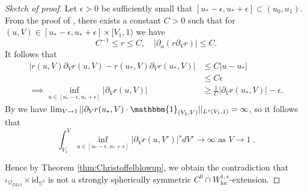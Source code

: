 \documentclass{article}
\newcommand{\Q}{\mathcal{Q}}
\newcommand{\loc}{\mathrm{loc}}
\newcommand{\Sp}{\mathbb{S}}
\newcommand{\id}{\mathrm{id}}
\begin{document}
\begin{proof}[Sketch of proof]
 Let $\epsilon>0$ be sufficiently small that $[u_*-\epsilon,u_*+\epsilon]\subset(u_0,u_1)$. From the proof of \cite[Proposition C.1]{LukOh19I}, there exists a constant $C>0$ such that for $(u,V)\in [u_*-\epsilon,u_*+\epsilon]\times [V_1,1)$ we have
    \begin{equation}
        C^{-1}\leq r\leq C,\quad \left|\partial_u(r\partial_Vr)\right|\leq C.
    \end{equation}
It follows that 
\begin{equation}
    \begin{split}
        \left|r(u,V)\partial_Vr(u,V)-r(u_*,V)\partial_Vr(u_*,V)\right|&\leq C|u-u_*|\\
        &\leq C\epsilon\\
        \implies\inf_{u\in[u_*-\epsilon,u_*+\epsilon]}\left|\partial_Vr(u,V)\right|&\geq \frac{1}{C}\left|\partial_Vr(u_*,V)\right|-\epsilon.
    \end{split}
\end{equation}
By \cite[Proposition C.1]{LukOh19I} we have $\lim_{V\to1}||\partial_Vr(u_*,V)\cdot\mathbbm{1}_{(V_1,V)}||_{L^s(V_1,1)}=\infty$, so it follows that 
\begin{equation}
    \int_{V_1}^V \inf_{u\in[u_*-\epsilon,u_*+\epsilon]}  \left|\partial_Vr(u,V')\right|^{s} dV'\to\infty\text{ as }V\to1\;.
\end{equation}
    
    Hence by Theorem \ref{thm:Christoffelblowup}, we obtain the contradiction that $\iota_{\Q_{DLO}} \times \id_{\Sp^2}$ is not a strongly spherically symmetric $C^0\cap W^{1,s}_{\loc}$-extension.
    

    
\end{proof}
\end{document}
